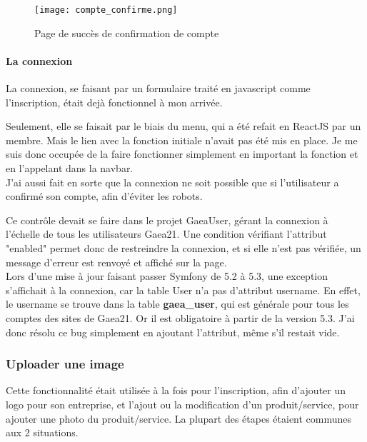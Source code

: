 \begin{figure}[H]
    \texttt{[image: compte\_confirme.png]}
    \caption{Page de succès de confirmation de compte}
\end{figure}


\paragraph{La connexion}

La connexion, se faisant par un formulaire traité en javascript comme l'inscription, était dejà fonctionnel à mon arrivée.

Seulement, elle se faisait par le biais du menu, qui a été refait en ReactJS par un membre. Mais le lien avec la fonction initiale n'avait pas été mis en place.
Je me suis donc occupée de la faire fonctionner simplement en important la fonction et en l'appelant dans la navbar.\\

J'ai aussi fait en sorte que la connexion ne soit possible que si l'utilisateur a confirmé son compte, afin d'éviter les robots.

Ce contrôle devait se faire dans le projet GaeaUser, gérant la connexion à l'échelle de tous les utilisateurs Gaea21. 
Une condition vérifiant l'attribut "enabled" permet donc de restreindre la connexion, et si elle n'est pas vérifiée, un message d'erreur est renvoyé et affiché sur la page. \\

Lors d'une mise à jour faisant passer Symfony de 5.2 à 5.3, une exception s'affichait à la connexion, car la table User n'a pas d'attribut username. En effet, le username se trouve dans la table \textbf{gaea\_user}, qui est générale pour tous les comptes des sites de Gaea21.
Or il est obligatoire à partir de la version 5.3. J'ai donc résolu ce bug simplement en ajoutant l'attribut, même s'il restait vide.


\subsubsection{Uploader une image}

\label{upload}
Cette fonctionnalité était utilisée à la fois pour l'inscription, afin d'ajouter un logo pour son entreprise, et l'ajout ou la modification d'un produit/service, pour ajouter une photo du produit/service.
La plupart des étapes étaient communes aux 2 situations.\\


